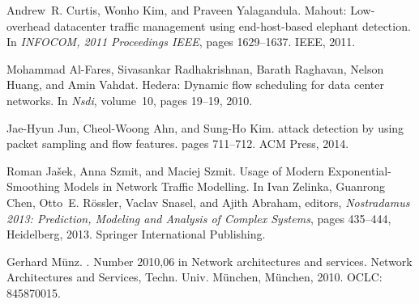 \begin{thebibliography}{100}

 Andrew~R. Curtis, Wonho Kim, and Praveen Yalagandula.
\newblock Mahout: {Low}-overhead datacenter traffic management using
  end-host-based elephant detection.
\newblock In {\em {INFOCOM}, 2011 {Proceedings} {IEEE}}, pages 1629--1637.
  IEEE, 2011.

 Mohammad Al-Fares, Sivasankar Radhakrishnan, Barath Raghavan, Nelson Huang, and
  Amin Vahdat.
\newblock Hedera: {Dynamic} flow scheduling for data center networks.
\newblock In {\em Nsdi}, volume~10, pages 19--19, 2010.

 Jae-Hyun Jun, Cheol-Woong Ahn, and Sung-Ho Kim.
 attack detection by using packet sampling and flow features.
\newblock pages 711--712. ACM Press, 2014.

 Roman Ja{\v s}ek, Anna Szmit, and Maciej Szmit.
\newblock Usage of {Modern} {Exponential}-{Smoothing} {Models} in {Network}
  {Traffic} {Modelling}.
\newblock In Ivan Zelinka, Guanrong Chen, Otto~E. R{\"o}ssler, Vaclav Snasel,
  and Ajith Abraham, editors, {\em Nostradamus 2013: {Prediction}, {Modeling}
  and {Analysis} of {Complex} {Systems}}, pages 435--444, Heidelberg, 2013.
  Springer International Publishing.

 Gerhard M{\"u}nz.
.
\newblock Number 2010,06 in Network architectures and services. Network
  Architectures and Services, Techn. Univ. M{\"u}nchen, M{\"u}nchen, 2010.
\newblock OCLC: 845870015.

\end{thebibliography}

\newpage{\pagestyle{empty}\cleardoublepage}
